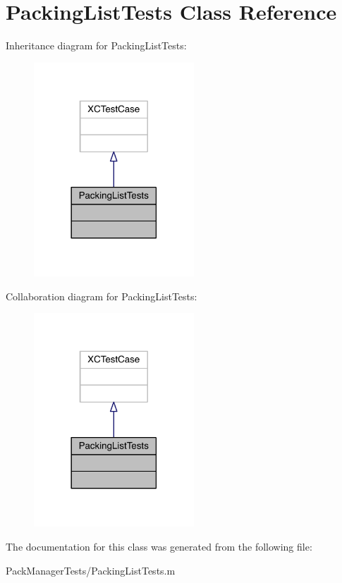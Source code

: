\hypertarget{interface_packing_list_tests}{\section{Packing\-List\-Tests Class Reference}
\label{interface_packing_list_tests}
}


Inheritance diagram for Packing\-List\-Tests\-:\nopagebreak
\begin{figure}[H]
\begin{center}
\leavevmode
\includegraphics[width=170pt]{interface_packing_list_tests__inherit__graph}
\end{center}
\end{figure}


Collaboration diagram for Packing\-List\-Tests\-:\nopagebreak
\begin{figure}[H]
\begin{center}
\leavevmode
\includegraphics[width=170pt]{interface_packing_list_tests__coll__graph}
\end{center}
\end{figure}


The documentation for this class was generated from the following file\-:\begin{DoxyCompactItemize}
\item 
Pack\-Manager\-Tests/Packing\-List\-Tests.\-m\end{DoxyCompactItemize}
